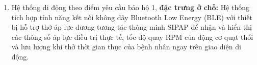 \documentclass[12pt,a4paper]{article}
\begin{document}
\begin{enumerate}
    \item Hệ thống di động theo điểm yêu cầu bảo hộ 1, \textbf{đặc trưng ở chỗ:} Hệ thống tích hợp tính năng kết nối không dây Bluetooth Low Energy (BLE) với thiết bị hỗ trợ thở áp lực dương tương tác thông minh SIPAP để nhận và hiển thị các thông số áp lực điều trị thực tế, tốc độ quay RPM của động cơ quạt thổi và lưu lượng khí thở thời gian thực của bệnh nhân ngay trên giao diện di động.
\end{enumerate}
\end{document}
